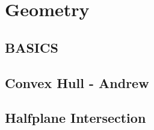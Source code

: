 \section{Geometry}
	\subsection{BASICS}
		
	\subsection{Convex Hull - Andrew}
		
	\subsection{Halfplane Intersection}
		
